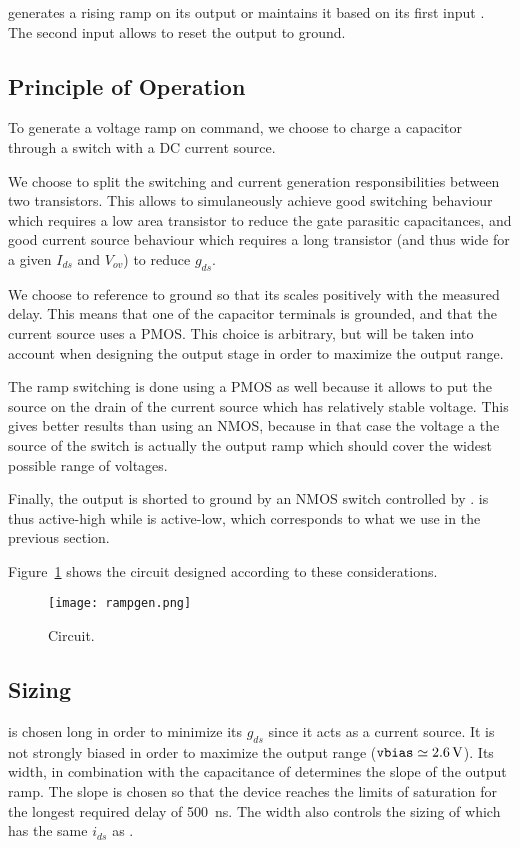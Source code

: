  generates a rising ramp on its output  or maintains it based on its first input . The second input  allows to reset the output to ground.

\subsection{Principle of Operation}
To generate a voltage ramp on command, we choose to charge a capacitor through a switch with a DC current source.

We choose to split the switching and current generation responsibilities between two transistors.
This allows to simulaneously achieve good switching behaviour which requires a low area transistor to reduce the gate parasitic capacitances, and good current source behaviour which requires a long transistor (and thus wide for a given $I_{ds}$ and $V_{ov}$) to reduce $g_{ds}$.

We choose to reference  to ground so that its scales positively with the measured delay.
This means that one of the capacitor terminals is grounded, and that the current source uses a PMOS.
This choice is arbitrary, but will be taken into account when designing the output stage in order to maximize the output range.

The ramp switching is done using a PMOS as well because it allows to put the source on the drain of the current source which has relatively stable voltage. This gives better results than using an NMOS, because in that case the voltage a the source of the switch is actually the output ramp which should cover the widest possible range of voltages.

Finally, the output is shorted to ground by an NMOS switch controlled by .  is thus active-high while  is active-low, which corresponds to what we use in the previous section.

Figure~\ref{fig:rampgen} shows the circuit designed according to these considerations.
\begin{figure}
  \centering
  \texttt{[image: rampgen.png]}
  \caption{ Circuit.\label{fig:rampgen}}
\end{figure}

\subsection{Sizing}
 is chosen long in order to minimize its $g_{ds}$ since it acts as a current source.
It is not strongly biased in order to maximize the output range ($\mathtt{vbias} \simeq \SI{2.6}{\volt}$).
Its width, in combination with the capacitance of  determines the slope of the output ramp.
The slope is chosen so that the device reaches the limits of saturation for the longest required delay of \SI{500}{\nano\second}.
The width also controls the sizing of  which has the same $i_{ds}$ as .

